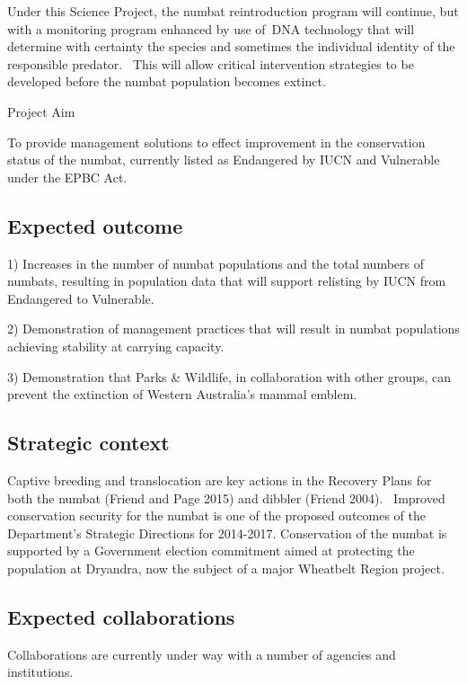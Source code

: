 \documentclass[version=last,
    paper=a4, %
    10pt, %
    usenames,
    dvipsnames,
    oneside, %
    headings=openany, %
    DIV=15 %
]{scrbook}
\begin{document}
Under this Science Project, the numbat reintroduction program will
continue, but with a monitoring program enhanced by use of~DNA
technology that will determine with certainty the species and sometimes
the individual identity of the responsible predator.~ This will allow
critical intervention strategies to be developed before the numbat
population becomes extinct.~~

Project Aim

To provide management solutions to effect improvement in the
conservation status of the numbat, currently listed as Endangered by
IUCN and Vulnerable under the EPBC Act.~




\subsection*{Expected outcome}

1) Increases in the number of numbat populations and the total numbers
of numbats, resulting in population data that will support relisting by
IUCN from Endangered to Vulnerable.~

2) Demonstration of management practices that will result in numbat
populations achieving stability at carrying capacity.~

3) Demonstration that Parks \& Wildlife, in collaboration with other
groups, can prevent the extinction of Western Australia's mammal emblem.




\subsection*{Strategic context}

Captive breeding and translocation are key actions in the Recovery Plans
for both the numbat (Friend and Page 2015) and dibbler (Friend 2004).~
Improved conservation security for the numbat is one of the proposed
outcomes of the Department's Strategic Directions for 2014-2017.
Conservation of the numbat is supported by a Government election
commitment aimed at protecting the population at Dryandra, now the
subject of a major Wheatbelt Region project.




\subsection*{Expected collaborations}

Collaborations are currently under way with a number of agencies and
institutions.~
\end{document}
